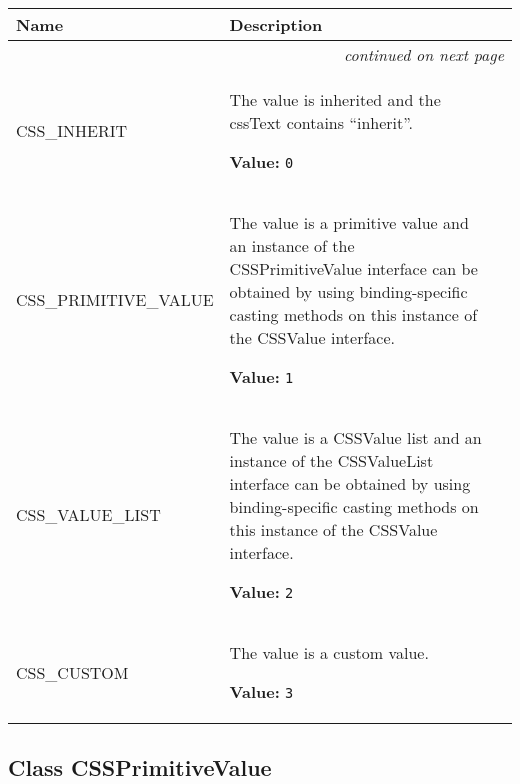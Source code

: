     \vspace{-1cm}
\hspace{\varindent}\begin{longtable}{|p{\varnamewidth}|p{\vardescrwidth}|l}
\cline{1-2}
\cline{1-2} \centering \textbf{Name} & \centering \textbf{Description}& \\
\cline{1-2}
\endhead\cline{1-2}\multicolumn{3}{r}{\small\textit{continued on next page}}\\\endfoot\cline{1-2}
\endlastfoot\raggedright C\-S\-S\-\_\-I\-N\-H\-E\-R\-I\-T\- & \raggedright The value is inherited and the cssText contains ``inherit''.

\textbf{Value:} 
{\tt 0}&\\
\cline{1-2}
\raggedright C\-S\-S\-\_\-P\-R\-I\-M\-I\-T\-I\-V\-E\-\_\-V\-A\-L\-U\-E\- & \raggedright The value is a primitive value and an instance of the
CSSPrimitiveValue interface can be obtained by using binding-specific
casting methods on this instance of the CSSValue interface.

\textbf{Value:} 
{\tt 1}&\\
\cline{1-2}
\raggedright C\-S\-S\-\_\-V\-A\-L\-U\-E\-\_\-L\-I\-S\-T\- & \raggedright The value is a CSSValue list and an instance of the CSSValueList
interface can be obtained by using binding-specific casting
methods on this instance of the CSSValue interface.

\textbf{Value:} 
{\tt 2}&\\
\cline{1-2}
\raggedright C\-S\-S\-\_\-C\-U\-S\-T\-O\-M\- & \raggedright The value is a custom value.

\textbf{Value:} 
{\tt 3}&\\
\cline{1-2}
\end{longtable}



\subsection{Class CSSPrimitiveValue}

